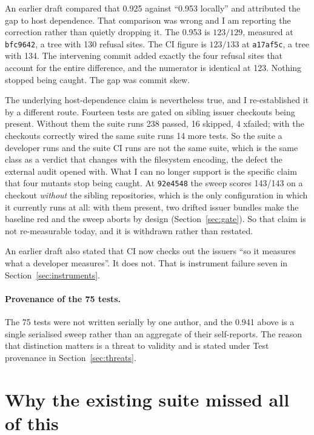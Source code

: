 \documentclass[11pt]{article}
\begin{document}
An earlier draft compared that 0.925 against ``0.953 locally'' and attributed the gap to host
dependence. That comparison was wrong and I am reporting the correction rather than quietly
dropping it. The 0.953 is $123/129$, measured at \texttt{bfc9642}, a tree with 130 refusal
sites. The CI figure is $123/133$ at \texttt{a17af5c}, a tree with 134. The intervening commit
added exactly the four refusal sites that account for the entire difference, and the numerator
is identical at 123. Nothing stopped being caught. The gap was commit skew.

The underlying host-dependence claim is nevertheless true, and I re-established it by a
different route. Fourteen tests are gated on sibling issuer checkouts being present. Without
them the suite runs 238 passed, 16 skipped, 4 xfailed; with the checkouts correctly wired the
same suite runs 14 more tests. So the suite a developer runs and the suite CI runs are not the
same suite, which is the same class as a verdict that changes with the filesystem encoding,
the defect the external audit opened with. What I can no longer support is the specific claim that
four mutants stop being caught. At \texttt{92e4548} the sweep scores 143/143 on a checkout
\emph{without} the sibling repositories, which is the only configuration in which it currently
runs at all: with them present, two drifted issuer bundles make the baseline red and the sweep
aborts by design (Section~\ref{sec:gate}). So that claim is not re-measurable today, and it is
withdrawn rather than restated.

An earlier draft also stated that CI now checks out the issuers ``so it measures what a
developer measures''. It does not. That is instrument failure seven in
Section~\ref{sec:instruments}.

\paragraph{Provenance of the 75 tests.} The 75 tests were not written serially by one
author, and the 0.941 above is a single serialised sweep rather than an aggregate of their
self-reports. The reason that distinction matters is a threat to validity and is stated under
Test provenance in Section~\ref{sec:threats}.

\section{Why the existing suite missed all of this}
\label{sec:whymissed}
\end{document}

